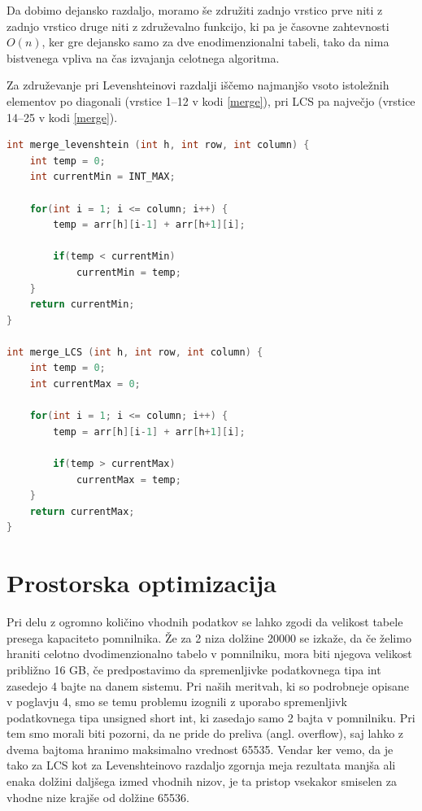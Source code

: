 \documentclass[a4paper,12pt,openright]{book}
\begin{document}
Da dobimo dejansko razdaljo, moramo še združiti zadnjo vrstico prve niti z zadnjo vrstico druge niti z združevalno funkcijo, ki pa je časovne zahtevnosti $O(n)$, ker gre dejansko samo za dve enodimenzionalni tabeli, tako da nima bistvenega vpliva na čas izvajanja celotnega algoritma. 

Za združevanje pri Levenshteinovi razdalji iščemo najmanjšo vsoto istoležnih elementov po diagonali (vrstice 1--12 v kodi \ref{merge}), pri LCS pa največjo (vrstice 14--25 v kodi \ref{merge}). 

\bigskip
\begin{lstlisting}[language=C++, caption={Združevalni funkciji za Levenshteinovo razdaljo in LCS}, captionpos=b, label=merge]
int merge_levenshtein (int h, int row, int column) {
    int temp = 0;
    int currentMin = INT_MAX;

    for(int i = 1; i <= column; i++) {
        temp = arr[h][i-1] + arr[h+1][i];

        if(temp < currentMin)
            currentMin = temp;
    }
    return currentMin;
}

int merge_LCS (int h, int row, int column) {
    int temp = 0;
    int currentMax = 0;

    for(int i = 1; i <= column; i++) {
        temp = arr[h][i-1] + arr[h+1][i];

        if(temp > currentMax)
            currentMax = temp;
    }
    return currentMax;
}
\end{lstlisting}

\section{Prostorska optimizacija}

Pri delu z ogromno količino vhodnih podatkov se lahko zgodi da velikost tabele presega kapaciteto pomnilnika. Že za 2 niza dolžine 20000 se izkaže, da če želimo hraniti celotno dvodimenzionalno tabelo v pomnilniku, mora biti njegova velikost približno 16 GB, če predpostavimo da spremenljivke podatkovnega tipa int zasedejo 4 bajte na danem sistemu. Pri naših meritvah, ki so podrobneje opisane v poglavju 4, smo se temu problemu izognili z uporabo spremenljivk podatkovnega tipa unsigned short int, ki zasedajo samo 2 bajta v pomnilniku. Pri tem smo morali biti pozorni, da ne pride do preliva (angl. overflow), saj lahko z dvema bajtoma hranimo maksimalno vrednost 65535. Vendar ker vemo, da je tako za LCS kot za Levenshteinovo razdaljo zgornja meja rezultata manjša ali enaka dolžini daljšega izmed vhodnih nizov, je ta pristop vsekakor smiselen za vhodne nize krajše od dolžine 65536. 
\end{document}
